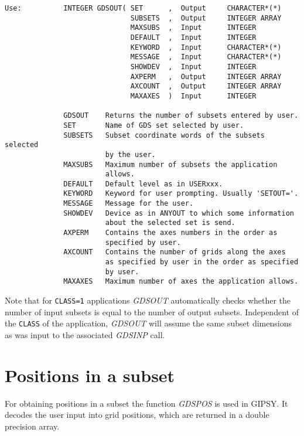\begin{verbatim}
Use:          INTEGER GDSOUT( SET      ,  Output     CHARACTER*(*)
                              SUBSETS  ,  Output     INTEGER ARRAY
                              MAXSUBS  ,  Input      INTEGER
                              DEFAULT  ,  Input      INTEGER
                              KEYWORD  ,  Input      CHARACTER*(*)
                              MESSAGE  ,  Input      CHARACTER*(*)
                              SHOWDEV  ,  Input      INTEGER
                              AXPERM   ,  Output     INTEGER ARRAY
                              AXCOUNT  ,  Output     INTEGER ARRAY
                              MAXAXES  )  Input      INTEGER

              GDSOUT    Returns the number of subsets entered by user.
              SET       Name of GDS set selected by user.
              SUBSETS   Subset coordinate words of the subsets selected
                        by the user.
              MAXSUBS   Maximum number of subsets the application
                        allows.
              DEFAULT   Default level as in USERxxx.
              KEYWORD   Keyword for user prompting. Usually 'SETOUT='.
              MESSAGE   Message for the user.
              SHOWDEV   Device as in ANYOUT to which some information
                        about the selected set is send.
              AXPERM    Contains the axes numbers in the order as
                        specified by user.
              AXCOUNT   Contains the number of grids along the axes
                        as specified by user in the order as specified
                        by user.
              MAXAXES   Maximum number of axes the application allows.
\end{verbatim}

Note that for {\tt CLASS=1} applications {\sl GDSOUT\/} automatically
checks whether the number of input subsets is equal to the number of
output subsets.  Independent of the {\tt CLASS} of the application, {\sl
GDSOUT\/} will assume the same subset dimensions as was input to the
associated {\sl GDSINP\/} call.


\section{Positions in a subset}

For obtaining positions in a subset the function {\sl GDSPOS\/} is used
in GIPSY.  It decodes the user input into grid positions, which are
returned in a double precision array.


